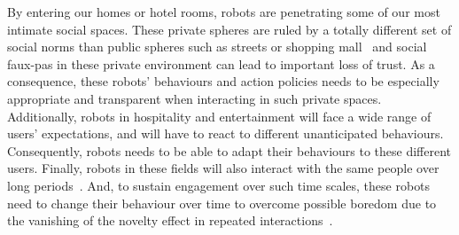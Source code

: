     By entering our homes or hotel rooms, robots are penetrating some of our most intimate social spaces. These private spheres are ruled by a totally different set of social norms than public spheres such as streets or shopping mall~\citep{weintraub1997theory} and social faux-pas in these private environment can lead to important loss of trust. As a consequence, these robots' behaviours and action policies needs to be especially appropriate and transparent when interacting in such private spaces. Additionally, robots in hospitality and entertainment will face a wide range of users' expectations, and will have to react to different unanticipated behaviours. Consequently, robots needs to be able to adapt their behaviours to these different users. Finally, robots in these fields will also interact with the same people over long periods~\citep{leite2013social}. And, to sustain engagement over such time scales, these robots need to change their behaviour over time to overcome possible boredom due to the vanishing of the novelty effect in repeated interactions~\citep{salter2004robots}.%

